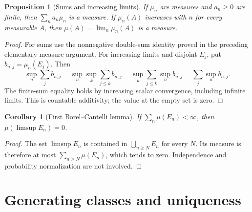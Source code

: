 \documentclass[11pt,oneside,openany]{book}
\newtheorem{proposition}[theorem]{Proposition}
\newtheorem{corollary}[theorem]{Corollary}
\theoremstyle{definition}
\theoremstyle{remark}
\newcommand{\family}[1]{}
\begin{document}
\begin{proposition}[Sums and increasing limits]
\family{D11.01.measure_sums_limits}\label{d11:01:measure-sums-limits}
If $\mu_n$ are measures and $a_n\geq0$ are finite, then
$\sum_n a_n\mu_n$ is a measure. If $\mu_n(A)$ increases with $n$ for every
measurable $A$, then $\mu(A)=\lim_n\mu_n(A)$ is a measure.
\end{proposition}
\begin{proof}
For sums use the nonnegative double-sum identity proved in the preceding
elementary-measure argument. For increasing limits and disjoint $E_j$, put
$b_{n,j}=\mu_n(E_j)$. Then
\[
 \sup_n\sum_j b_{n,j}=\sup_n\sup_k\sum_{j\leq k}b_{n,j}
 =\sup_k\sum_{j\leq k}\sup_n b_{n,j}
 =\sum_j\sup_n b_{n,j}.
\]
The finite-sum equality holds by increasing scalar convergence, including
infinite limits. This is countable additivity; the value at the empty set is zero.
\end{proof}

\begin{corollary}[First Borel--Cantelli lemma]
\family{D11.01.borel_cantelli_one}\label{d11:01:borel-cantelli-one}
If $\sum_n\mu(E_n)<\infty$, then $\mu(\limsup E_n)=0$.
\end{corollary}
\begin{proof}
The set $\limsup E_n$ is contained in $\bigcup_{n\geq N}E_n$ for every $N$.
Its measure is therefore at most $\sum_{n\geq N}\mu(E_n)$, which tends to
zero. Independence and probability normalization are not involved.
\end{proof}

\section{Generating classes and uniqueness}
\end{document}
